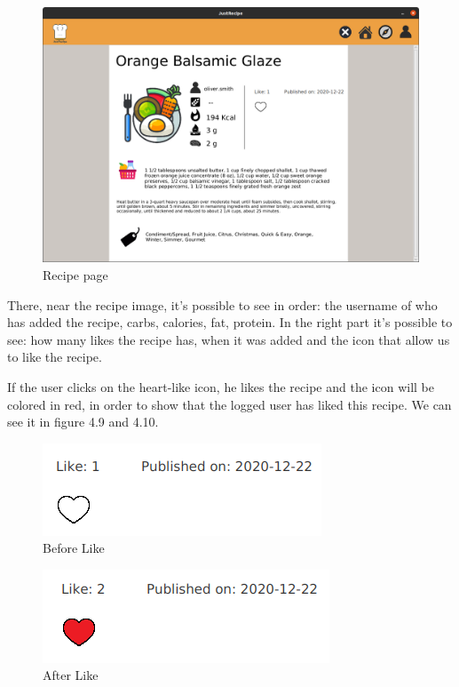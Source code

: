 \documentclass[a4paper]{report}
\begin{document}
\begin{figure}[htpb]
	\centering
	\includegraphics[scale=0.35]{img/user_manual/recipepage.png}
	\caption{Recipe page}
\end{figure}

\noindent There, near the recipe image, it's possible to see in order: the username of who has added the recipe, carbs, calories, fat, protein. In the right part it's possible to see: how many likes the recipe has, when it was added and the icon that allow us to like the recipe.

\noindent If the user clicks on the heart-like icon, he likes the recipe and the icon will be colored in red, in order to show that the logged user has liked this recipe. We can see it in figure 4.9 and 4.10.

\begin{figure}[htpb]
	\centering
	\includegraphics[scale=0.31]{img/user_manual/beforelike.png}
	\caption{Before Like}
\end{figure}


\begin{figure}[htpb]
	\centering
	\includegraphics[scale=0.31]{img/user_manual/afterlike.png}
	\caption{After Like}
\end{figure}
\end{document}
